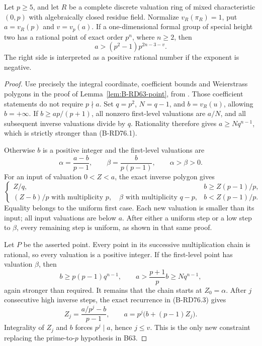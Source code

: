 \begin{lemma}
\label{lem:B-RD76-point}
Let \(p\ge5\), and let \(R\) be a complete discrete valuation
ring of mixed characteristic \((0,p)\) with algebraically closed
residue field. Normalize \(v_R(\pi_R)=1\), put
\(a=v_R(p)\) and \(v=v_p(a)\). If a one-dimensional formal
group of special height two has a rational point of exact order
\(p^n\), where \(n\ge2\), then
\[
             a>(p^2-1)p^{2n-3-v}.                 \tag{B-RD76.1}
\]
The right side is interpreted as a positive rational number if
the exponent is negative.
\end{lemma}
\begin{proof}
Use precisely the integral coordinate, coefficient bounds and
Weierstrass polygons in the proof of
Lemma~\ref{lem:B-RD63-point}, from
\cite[Proposition~5.7; (12.3)--(12.5); Proposition~12.10 and proof]
{HopkinsGross1994Bundles}. Those coefficient statements do not
require \(p\nmid a\). Set \(q=p^2\), \(N=q-1\), and
\(b=v_R(u)\), allowing \(b=+\infty\).
If \(b\ge ap/(p+1)\), all nonzero first-level valuations are
\(a/N\), and all subsequent inverse valuations divide by \(q\).
Rationality therefore gives \(a\ge Nq^{n-1}\), which is strictly
stronger than (B-RD76.1).

Otherwise \(b\) is a positive integer and the first-level
valuations are
\[
 \alpha=\frac{a-b}{p-1},\qquad
 \beta=\frac{b}{p(p-1)},\qquad \alpha>\beta>0.
                                                     \tag{B-RD76.2}
\]
For an input of valuation \(0<Z<a\), the exact inverse polygon
gives
\[
 \begin{cases}
 Z/q,& b\ge Z(p-1)/p,\\
 (Z-b)/p\text{ with multiplicity }p,
 \quad\beta\text{ with multiplicity }q-p,
      &b<Z(p-1)/p.
 \end{cases}                                         \tag{B-RD76.3}
\]
Equality belongs to the uniform first case. Each new valuation
is smaller than its input; all input valuations are below \(a\).
After either a uniform step or a low step to \(\beta\), every
remaining step is uniform, as shown in that same proof.

Let \(P\) be the asserted point. Every point in its successive
multiplication chain is rational, so every valuation is a
positive integer. If the first-level point has valuation
\(\beta\), then
\[
 b\ge p(p-1)q^{n-1},\qquad
 a>\frac{p+1}{p}b\ge Nq^{n-1},
\]
again stronger than required. It remains that the chain starts
at \(Z_0=\alpha\). After \(j\) consecutive high inverse steps,
the exact recurrence in (B-RD76.3) gives
\[
 Z_j=\frac{a/p^j-b}{p-1},\qquad
 a=p^j\bigl(b+(p-1)Z_j\bigr).
                                                     \tag{B-RD76.4}
\]
Integrality of \(Z_j\) and \(b\) forces \(p^j\mid a\), hence
\(j\le v\). This is the only new constraint replacing the
prime-to-\(p\) hypothesis in B63.


\end{proof}
